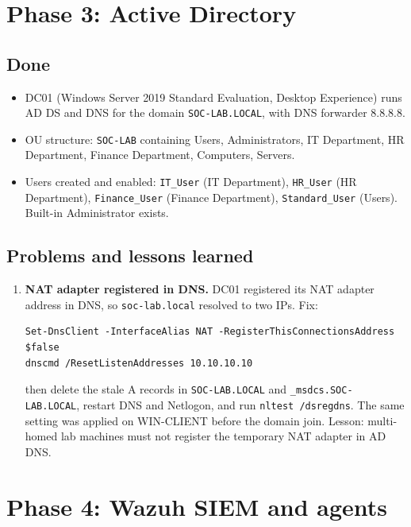 \documentclass[11pt,a4paper]{article}
\begin{document}
\section{Phase 3: Active Directory}

\subsection{Done}
\begin{itemize}
  \item DC01 (Windows Server 2019 Standard Evaluation, Desktop Experience)
        runs AD DS and DNS for the domain \texttt{SOC-LAB.LOCAL}, with DNS
        forwarder 8.8.8.8.
  \item OU structure: \texttt{SOC-LAB} containing Users, Administrators,
        IT Department, HR Department, Finance Department, Computers, Servers.
  \item Users created and enabled: \texttt{IT\_User} (IT Department),
        \texttt{HR\_User} (HR Department), \texttt{Finance\_User} (Finance
        Department), \texttt{Standard\_User} (Users). Built-in Administrator
        exists.
\end{itemize}

\subsection{Problems and lessons learned}
\begin{enumerate}
  \item \textbf{NAT adapter registered in DNS.} DC01 registered its NAT
        adapter address in DNS, so \texttt{soc-lab.local} resolved to two IPs.
        Fix:
\begin{lstlisting}
Set-DnsClient -InterfaceAlias NAT -RegisterThisConnectionsAddress $false
dnscmd /ResetListenAddresses 10.10.10.10
\end{lstlisting}
        then delete the stale A records in \texttt{SOC-LAB.LOCAL} and
        \texttt{\_msdcs.SOC-LAB.LOCAL}, restart DNS and Netlogon, and run
        \texttt{nltest /dsregdns}. The same setting was applied on WIN-CLIENT
        before the domain join. Lesson: multi-homed lab machines must not
        register the temporary NAT adapter in AD DNS.
\end{enumerate}

\section{Phase 4: Wazuh SIEM and agents}
\end{document}
